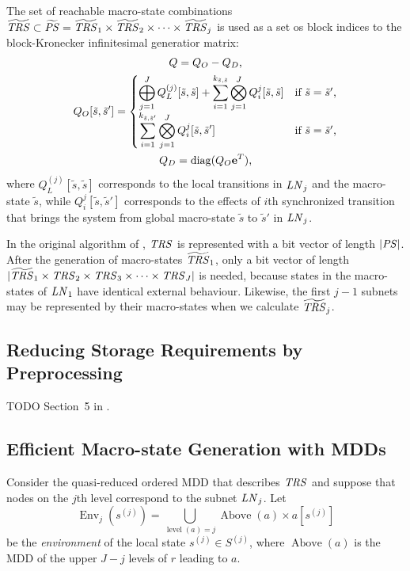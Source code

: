 \documentclass[a4paper,10pt,twoside,openright]{memoir}
\newcommand*{\LN}{\textnormal{\emph{LN}}}
\renewcommand*{\vec}[1]{\boldsymbol{\mathrm{#1}}}
\newcommand*{\TRS}{\textnormal{\emph{TRS}}}
\newcommand*{\PS}{\textnormal{\emph{PS}}}
\newcommand*{\macroS}{}\let\macroS\tilde
\newcommand*{\macroStates}{}\let\macroStates\widetilde
\newcommand*{\macroTRS}{\macroStates{\TRS}}
\DeclareMathOperator{\diag}{diag}
\DeclareMathOperator{\level}{level}
\DeclareMathOperator{\Env}{Env}
\DeclareMathOperator{\Above}{Above}
\begin{document}
The set of reachable macro-state combinations
$\macroTRS \subset \macroStates{\PS} = \macroTRS_1 \times \macroTRS_2
\times \cdots \times \macroTRS_j$
is used as a set os block indices to the block-Kronecker infinitesimal
generatior matrix:
\begin{gather}
  Q = Q_O - Q_D \text, \\
  Q_O[\macroS{s}, \macroS{s}'] = \begin{cases} \displaystyle
    \bigoplus_{j = 1}^J Q_L^{(j)}[\macroS{s}, \macroS{s}] + \sum_{i =
      1}^{k_{\macroS{s}, \macroS{s}}} \bigotimes_{j = 1}^J
    Q_{i}^{j}[\macroS{s},
    \macroS{s}] & \text{if $\macroS{s} = \macroS{s}'$,} \\
    \displaystyle \sum_{i = 1}^{k_{\macroS{s}, \macroS{s}'}}
    \bigotimes_{j = 1}^J Q_{i}^{j}[\macroS{s}, \macroS{s}'] & \text{if
      $\macroS{s} = \macroS{s}'$,}
  \end{cases} \\
  Q_D = \diag (Q_O \vec{e}^T) \text,
\end{gather}
where $Q_L^{(j)}[\macroS{s}, \macroS{s}]$ corresponds to the local
transitions in $\LN_j$ and the macro-state $\macroS{s}$, while
$Q_{i}^{j}[\macroS{s}, \macroS{s}']$ corresponds to the effects of
$i$th synchronized transition that brings the system from global
macro-state $\macroS{s}$ to $\macroS{s}'$ in $\LN_j$.

In the original algorithm of \citet{DBLP:journals/tse/Buchholz99},
$\TRS$ is represented with a bit vector of length $\lvert \PS
\rvert$.
After the generation of macro-states $\macroTRS_1$, only a bit vector
of length
$\lvert \macroTRS_1 \times \TRS_2 \times \TRS_3 \times \cdots \times
\TRS_J \rvert$
is needed, because states in the macro-states of $\LN_1$ have
identical external behaviour. Likewise, the first $j - 1$ subnets may
be represented by their macro-states when we calculate $\macroTRS_j$.

\subsection{Reducing Storage Requirements by Preprocessing}

TODO Section~5 in \citet{DBLP:journals/tse/Buchholz99}.

\subsection{Efficient Macro-state Generation with MDDs}

Consider the quasi-reduced ordered MDD that describes $\TRS$ and
suppose that nodes on the $j$th level correspond to the subnet
$\LN_j$. Let
\begin{equation}
  \Env_j(s^{(j)}) = \bigcup_{\level(a) = j} \Above(a) \times a[s^{(j)}]
\end{equation}
be the \emph{environment} of the local state $s^{(j)} \in S^{(j)}$,
where $\Above(a)$ is the MDD of the upper $J - j$ levels of $r$
leading to $a$.
\end{document}
